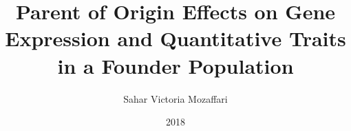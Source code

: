 \documentclass{ucetd}
\title{Parent of Origin Effects on Gene Expression and Quantitative Traits in a Founder Population}
\author{Sahar Victoria Mozaffari}
\date{2018}
\begin{document}
\maketitle

\makecopyright
\makededication


\tableofcontents
\listoffigures
\listoftables





\mainmatter











\makebibliography

%
%
\end{document}
